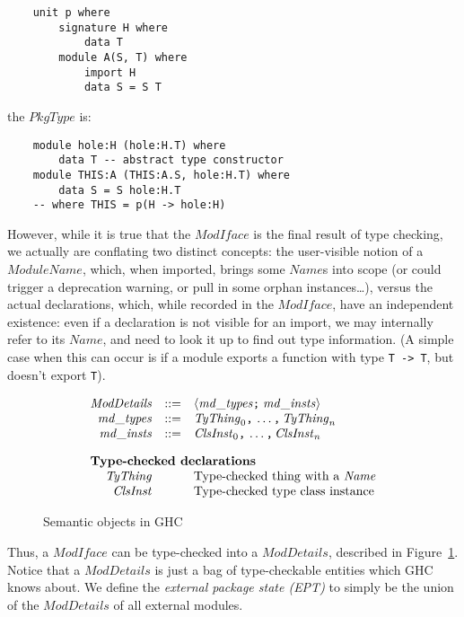 \documentclass{article}
\newcommand{\I}[1]{\ensuremath{\mathit{#1}}}
\begin{document}
\begin{verbatim}
    unit p where
        signature H where
            data T
        module A(S, T) where
            import H
            data S = S T
\end{verbatim}
%
the \I{PkgType} is:

\begin{verbatim}
    module hole:H (hole:H.T) where
        data T -- abstract type constructor
    module THIS:A (THIS:A.S, hole:H.T) where
        data S = S hole:H.T
    -- where THIS = p(H -> hole:H)
\end{verbatim}
%
However, while it is true that the \I{ModIface} is the final result
of type checking, we actually are conflating two distinct concepts: the user-visible
notion of a \I{ModuleName}, which, when imported, brings some \I{Name}s
into scope (or could trigger a deprecation warning, or pull in some
orphan instances\ldots), versus the actual declarations, which, while recorded
in the \I{ModIface}, have an independent existence: even if a declaration
is not visible for an import, we may internally refer to its \I{Name}, and
need to look it up to find out type information.  (A simple case when
this can occur is if a module exports a function with type \verb|T -> T|,
but doesn't export \verb|T|).

\begin{figure}[htpb]
$$
\begin{array}{rcll}
\I{ModDetails} & ::= & \langle\I{md\_types} \verb|;|\; \I{md\_insts}\rangle \\
\I{md\_types}  & ::= & \I{TyThing}_0 \verb|,|\, \ldots\verb|,|\, \I{TyThing}_n \\
\I{md\_insts}  & ::= & \I{ClsInst}_0 \verb|,|\, \ldots\verb|,|\, \I{ClsInst}_n \\[1em]
\multicolumn{3}{l}{\mbox{\bf Type-checked declarations}} \\
\I{TyThing}    &     & \mbox{Type-checked thing with a \I{Name}} \\
\I{ClsInst}    &     & \mbox{Type-checked type class instance} \\
\end{array}
$$
\caption{Semantic objects in GHC} \label{fig:typecheck-more}
\end{figure}

Thus, a \I{ModIface} can be type-checked into a \I{ModDetails}, described in
Figure~\ref{fig:typecheck-more}.  Notice that a \I{ModDetails} is just
a bag of type-checkable entities which GHC knows about.  We
define the \emph{external package state (EPT)} to
simply be the union of the \I{ModDetails}
of all external modules.
\end{document}
